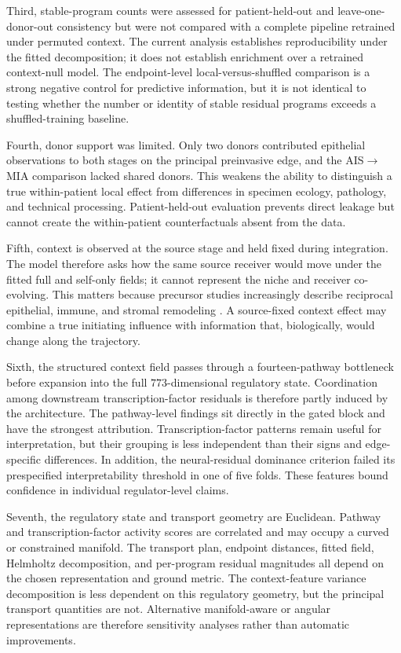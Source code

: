 Third, stable-program counts were assessed for patient-held-out and leave-one-donor-out consistency but were not compared with a complete pipeline retrained under permuted context. The current analysis establishes reproducibility under the fitted decomposition; it does not establish enrichment over a retrained context-null model. The endpoint-level local-versus-shuffled comparison is a strong negative control for predictive information, but it is not identical to testing whether the number or identity of stable residual programs exceeds a shuffled-training baseline.

Fourth, donor support was limited. Only two donors contributed epithelial observations to both stages on the principal preinvasive edge, and the AIS$\rightarrow$MIA comparison lacked shared donors. This weakens the ability to distinguish a true within-patient local effect from differences in specimen ecology, pathology, and technical processing. Patient-held-out evaluation prevents direct leakage but cannot create the within-patient counterfactuals absent from the data.

Fifth, context is observed at the source stage and held fixed during integration. The model therefore asks how the same source receiver would move under the fitted full and self-only fields; it cannot represent the niche and receiver co-evolving. This matters because precursor studies increasingly describe reciprocal epithelial, immune, and stromal remodeling \autocite{Peng2025-xu,Takano2024-ys,Cardoso2026-kp,Elhossiny2026-pq}. A source-fixed context effect may combine a true initiating influence with information that, biologically, would change along the trajectory.

Sixth, the structured context field passes through a fourteen-pathway bottleneck before expansion into the full $773$-dimensional regulatory state. Coordination among downstream transcription-factor residuals is therefore partly induced by the architecture. The pathway-level findings sit directly in the gated block and have the strongest attribution. Transcription-factor patterns remain useful for interpretation, but their grouping is less independent than their signs and edge-specific differences. In addition, the neural-residual dominance criterion failed its prespecified interpretability threshold in one of five folds. These features bound confidence in individual regulator-level claims.

Seventh, the regulatory state and transport geometry are Euclidean. Pathway and transcription-factor activity scores are correlated and may occupy a curved or constrained manifold. The transport plan, endpoint distances, fitted field, Helmholtz decomposition, and per-program residual magnitudes all depend on the chosen representation and ground metric. The context-feature variance decomposition is less dependent on this regulatory geometry, but the principal transport quantities are not. Alternative manifold-aware or angular representations are therefore sensitivity analyses rather than automatic improvements.

